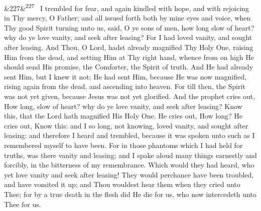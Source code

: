 \documentclass[12pt]{article}
\newcommand{\para}[1][]{\par\noindent\ifx&#1&\else\textsuperscript{\footnotesize #1}~\fi}
\begin{document}
\para[227] I trembled for fear, and again kindled with hope, and with rejoicing in Thy mercy, O Father; and all issued forth both by mine eyes and voice, when Thy good Spirit turning unto us, said, O ye sons of men, how long slow of heart? why do ye love vanity, and seek after leasing? For I had loved vanity, and sought after leasing. And Thou, O Lord, hadst already magnified Thy Holy One, raising Him from the dead, and setting Him at Thy right hand, whence from on high He should send His promise, the Comforter, the Spirit of truth. And He had already sent Him, but I knew it not; He had sent Him, because He was now magnified, rising again from the dead, and ascending into heaven. For till then, the Spirit was not yet given, because Jesus was not yet glorified. And the prophet cries out, How long, slow of heart? why do ye love vanity, and seek after leasing? Know this, that the Lord hath magnified His Holy One. He cries out, How long? He cries out, Know this: and I so long, not knowing, loved vanity, and sought after leasing: and therefore I heard and trembled, because it was spoken unto such as I remembered myself to have been. For in those phantoms which I had held for truths, was there vanity and leasing; and I spake aloud many things earnestly and forcibly, in the bitterness of my remembrance. Which would they had heard, who yet love vanity and seek after leasing! They would perchance have been troubled, and have vomited it up; and Thou wouldest hear them when they cried unto Thee; for by a true death in the flesh did He die for us, who now intercedeth unto Thee for us.
\end{document}
